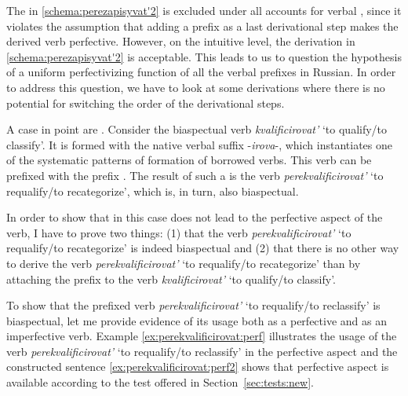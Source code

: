 The  in \ref{schema:perezapisyvat'2} is excluded under all accounts for verbal , since it violates the assumption that adding a prefix as a last derivational step makes the derived verb perfective. However, on the intuitive level, the derivation in \ref{schema:perezapisyvat'2} is acceptable. This leads to us to question the hypothesis of a uniform perfectivizing function of all the verbal prefixes in Russian. In order to address this question, we have to look at some derivations where there is no potential for switching the order of the derivational steps.

A case in point are . Consider the biaspectual verb \textit{kvalificirovat'} `to qualify/to classify'. It is formed with the native verbal suffix -\textit{irova}-, which instantiates one of the systematic patterns of formation of borrowed verbs. This verb can be prefixed with the  prefix . The result of such a  is the verb \textit{perekvalificirovat'} `to requalify/to recategorize', which is, in turn, also biaspectual.

In order to show that in this case  does not lead to the perfective aspect of the verb, I have to prove two things: (1) that the verb \textit{perekvalificirovat'} `to requalify/to recategorize' is indeed biaspectual and (2) that there is no other way to derive the verb \textit{perekvalificirovat'} `to requalify/to recategorize' than by attaching the prefix  to the verb \textit{kvalificirovat'} `to qualify/to classify'.

To show that the prefixed verb \textit{perekvalificirovat'} `to requalify/to reclassify' is  biaspectual, let me provide evidence of its usage both as a perfective and as an imperfective verb. Example \ref{ex:perekvalificirovat:perf} illustrates the usage of the verb \textit{perekvalificirovat'} `to requalify/to reclassify' in the perfective aspect and the constructed sentence \ref{ex:perekvalificirovat:perf2} shows that perfective aspect is available according to the test offered in Section~\ref{sec:tests:new}.

